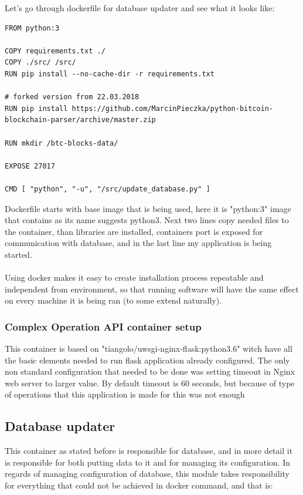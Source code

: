 \documentclass[12pt, en, eng]{mgr}
\begin{document}
Let's go through dockerfile for database updater and see what it looks like:
\begin{verbatim}
FROM python:3

COPY requirements.txt ./
COPY ./src/ /src/
RUN pip install --no-cache-dir -r requirements.txt

# forked version from 22.03.2018
RUN pip install https://github.com/MarcinPieczka/python-bitcoin-blockchain-parser/archive/master.zip

RUN mkdir /btc-blocks-data/

EXPOSE 27017

CMD [ "python", "-u", "/src/update_database.py" ]
\end{verbatim}

Dockerfile starts with base image that is being used, here it is "python:3" image that contains as its name suggests python3.
Next two lines copy needed files to the container, than libraries are installed, containers port is exposed for communication with database, and in the last line my application is being started.
\\
\\
Using docker makes it easy to create installation process repeatable and independent from environment, so that running software will have the same effect on every machine it is being ran (to some extend naturally). 

\subsubsection{Complex Operation API container setup}
This container is based on "tiangolo/uwsgi-nginx-flask:python3.6" witch have all the basic elements needed to run flask application already configured. The only non standard configuration that needed to be done was setting timeout in Nginx web server to larger value. By default timeout is 60 seconds, but because of type of operations that this application is made for this was not enough  

\subsection{Database updater}
This container as stated before is responsible for database, and in more detail it is responsible for both putting data to it and for managing its configuration. In regards of managing configuration of database, this module takes responsibility for everything that could not be achieved in docker command, and that is:
\end{document}
